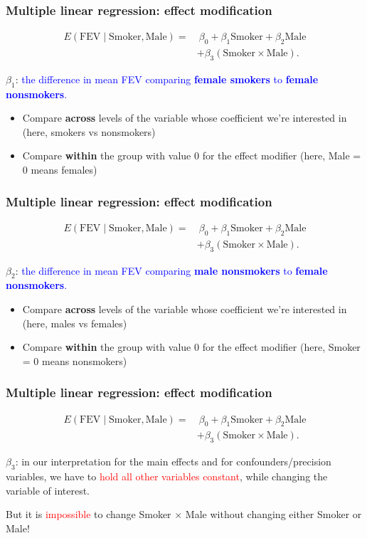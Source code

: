 \documentclass[12pt, 
hyperref={colorlinks=true, linkcolor=blue, urlcolor=cyan},dvipsnames]{beamer}
\begin{document}
\begin{frame}
\frametitle{Multiple linear regression: effect modification}
\begin{align*}
E(\text{FEV} \mid \text{Smoker}, \text{Male}) = & \ \beta_0 + \beta_1 \text{Smoker} + \beta_2 \text{Male}\\
& + \beta_3 (\text{Smoker} \times \text{Male}).
\end{align*}

$\beta_1$: \textcolor{blue}{the difference in mean FEV comparing \textbf{female smokers} to \textbf{female nonsmokers}.}
\begin{itemize}
\item Compare \textbf{across} levels of the variable whose coefficient we're interested in (here, smokers vs nonsmokers)
\item Compare \textbf{within} the group with value 0 for the effect modifier (here, Male = 0 means females)
\end{itemize}
\end{frame}

\begin{frame}
\frametitle{Multiple linear regression: effect modification}
\begin{align*}
E(\text{FEV} \mid \text{Smoker}, \text{Male}) = & \ \beta_0 + \beta_1 \text{Smoker} + \beta_2 \text{Male}\\
& + \beta_3 (\text{Smoker} \times \text{Male}).
\end{align*}

$\beta_2$: \textcolor{blue}{the difference in mean FEV comparing \textbf{male nonsmokers} to \textbf{female nonsmokers}.}
\begin{itemize}
\item Compare \textbf{across} levels of the variable whose coefficient we're interested in (here, males vs females)
\item Compare \textbf{within} the group with value 0 for the effect modifier (here, Smoker = 0 means nonsmokers)
\end{itemize}
\end{frame}

\begin{frame}
\frametitle{Multiple linear regression: effect modification}
\begin{align*}
E(\text{FEV} \mid \text{Smoker}, \text{Male}) = & \ \beta_0 + \beta_1 \text{Smoker} + \beta_2 \text{Male}\\
& + \beta_3 (\text{Smoker} \times \text{Male}).
\end{align*}

$\beta_3$: in our interpretation for the main effects and for confounders/precision variables, we have to \textcolor{red}{hold all other variables constant}, while changing the variable of interest.

But it is \textcolor{red}{impossible} to change Smoker $\times$ Male without changing either Smoker or Male!
\end{frame}
\end{document}
